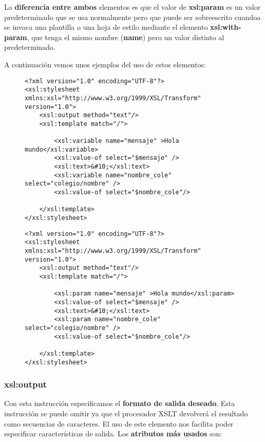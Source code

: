 La \textbf{diferencia entre ambos} elementos es que el valor de \textbf{xsl:param} es un valor predeterminado que se usa normalmente pero que puede ser sobreescrito cuandoa se invoca una plantilla o una hoja de estilo mediante el elemento \textbf{xsl:with-param}, que tenga el mismo nombre (\textbf{name}) pero un valor distinto al predeterminado.

A continuación vemos unos ejemplos del uso de estos elementos:

\begin{figure}[H]
    \begin{tcolorbox}[sharp corners, colback=yellow!30, colframe=white!20]
        \scriptsize
\begin{verbatim}
<?xml version="1.0" encoding="UTF-8"?>
<xsl:stylesheet xmlns:xsl="http://www.w3.org/1999/XSL/Transform" version="1.0">
    <xsl:output method="text"/>
    <xsl:template match="/">

        <xsl:variable name="mensaje" >Hola mundo</xsl:variable>
        <xsl:value-of select="$mensaje" />
        <xsl:text>&#10;</xsl:text>
        <xsl:variable name="nombre_cole" select="colegio/nombre" />
        <xsl:value-of select="$nombre_cole"/>

    </xsl:template>
</xsl:stylesheet>
\end{verbatim}
    \end{tcolorbox}
\end{figure}

\begin{figure}[H]
    \begin{tcolorbox}[sharp corners, colback=yellow!30, colframe=white!20]
        \scriptsize
\begin{verbatim}
<?xml version="1.0" encoding="UTF-8"?>
<xsl:stylesheet xmlns:xsl="http://www.w3.org/1999/XSL/Transform" version="1.0">
    <xsl:output method="text"/>
    <xsl:template match="/">

        <xsl:param name="mensaje" >Hola mundo</xsl:param>
        <xsl:value-of select="$mensaje" />
        <xsl:text>&#10;</xsl:text>
        <xsl:param name="nombre_cole" select="colegio/nombre" />
        <xsl:value-of select="$nombre_cole"/>

    </xsl:template>
</xsl:stylesheet>
\end{verbatim}
    \end{tcolorbox}
\end{figure}

\subsubsection{xsl:output}
Con esta instrucción especificamos el \textbf{formato de salida deseado}. Esta instrucción se puede omitir ya que el procesador XSLT devolverá el resultado como secuencias de caracteres. El uso de este elemento nos facilita poder especificar características de salida. Los \textbf{atributos más usados} son:

